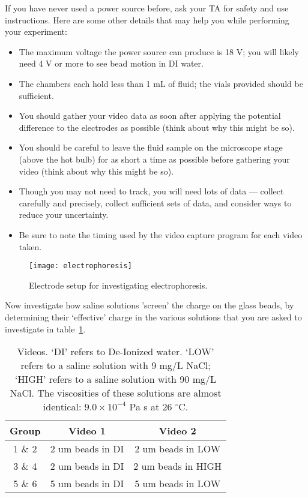 If you have never used a power source before, ask your TA for safety and use instructions. Here are some other details that may help you while performing your experiment:
\begin{itemize}
\itemsep-0.3em
\item The maximum voltage the power source can produce is 18 V; you will likely need 4 V or more to see bead motion in DI water.
\item The chambers each hold less than 1 mL of fluid; the vials provided should be sufficient.
\item You should gather your video data as soon after applying the potential difference to the
electrodes as possible (think about why this might be so).
\item You should be careful to leave the fluid sample on the microscope stage (above the hot
bulb) for as short a time as possible before gathering your video (think about why this might
be so).
\item Though you may not need to track, you will need lots of data — collect carefully and
precisely, collect sufficient sets of data, and consider ways to reduce your uncertainty.
\item Be sure to note the timing used by the video capture program for each video taken.
\end{itemize}

\begin{figure}[hbtp]
	\centering
	\texttt{[image: electrophoresis]}
	\caption{Electrode setup for investigating electrophoresis.}
	\label{fig:electroph}
\end{figure}

Now investigate how saline solutions 'screen' the charge on the glass beads, by determining their `effective' charge in the various solutions that you are asked to investigate in table~\ref{tab:lab7-vids}.
\begin{table}[ht]
	\centering
	\begin{tabular}{|c|c|c|}
	\hline 
	\textbf{Group} & \textbf{Video 1} & \textbf{Video 2} \\ 
	\hline 
	1 \& 2 & 2 um beads in DI & 2 um beads in LOW \\ 
	\hline 
	3 \& 4 & 2 um beads in DI & 2 um beads in HIGH \\ 
	\hline 
	5 \& 6 & 5 um beads in DI & 5 um beads in LOW \\ 
	\hline 
	\end{tabular}
	\caption{Videos. `DI' refers to De-Ionized water. `LOW' refers to a saline solution with 9 mg/L NaCl; `HIGH' refers to a saline solution with 90 mg/L NaCl. The viscosities of these solutions are almost identical: $9.0 \times 10^{-4}$ Pa s at 26 $^{\circ}$C.}
	\label{tab:lab7-vids}
\end{table} 